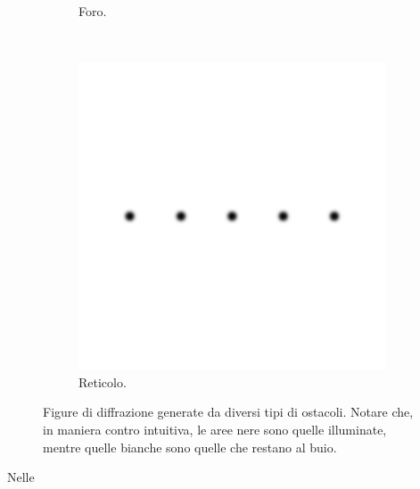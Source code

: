 \begin{figure}[t]
\begin{subfigure}[b]{0.3\textwidth}
        \caption{Foro.}
        \label{fig:foro}
    \end{subfigure}
    ~ %
    \begin{subfigure}[b]{0.3\textwidth}
        \includegraphics[width=\textwidth]{f3.png}
        \caption{Reticolo.}
        \label{fig:ret}
    \end{subfigure}
    \caption{Figure di diffrazione generate da diversi tipi di ostacoli. Notare che, in maniera contro intuitiva,
        le aree nere sono quelle illuminate, mentre quelle bianche sono quelle che restano al buio.}
    \label{fig:diff}
\end{figure}

Nelle

